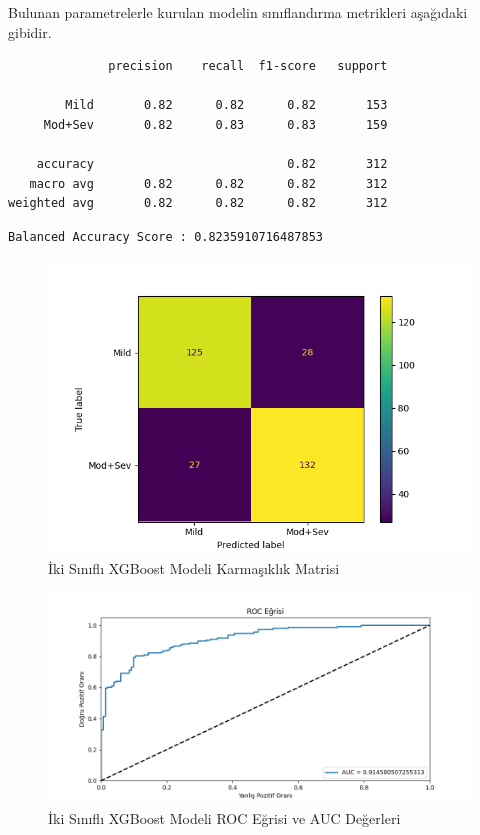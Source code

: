 \documentclass[12pt,twoside]{deuthesis}
\begin{document}
Bulunan parametrelerle kurulan modelin sınıflandırma metrikleri aşağıdaki gibidir.
\begin{verbatim}
              precision    recall  f1-score   support

        Mild       0.82      0.82      0.82       153
     Mod+Sev       0.82      0.83      0.83       159

    accuracy                           0.82       312
   macro avg       0.82      0.82      0.82       312
weighted avg       0.82      0.82      0.82       312
\end{verbatim}
\begin{verbatim}
Balanced Accuracy Score : 0.8235910716487853
\end{verbatim}
\begin{figure}

{\centering \includegraphics[width=1.05\linewidth,height=0.6\textheight]{figure/XGB_bin_conf} 

}

\caption{İki Sınıflı XGBoost Modeli Karmaşıklık Matrisi}\label{fig:unnamed-chunk-75}
\end{figure}
\begin{figure}

{\centering \includegraphics[width=1.05\linewidth,height=0.6\textheight]{figure/XGBClassifier_binary_roc} 

}

\caption{İki Sınıflı XGBoost Modeli ROC Eğrisi ve AUC Değerleri}\label{fig:unnamed-chunk-76}
\end{figure}
\end{document}
